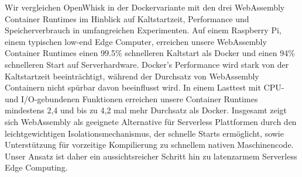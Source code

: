 \documentclass[draft, final, x11names, svgnames]{template/vutinfth} %
\begin{document}
\begin{kurzfassung}
Wir vergleichen OpenWhisk in der Dockervariante mit den drei WebAssembly Container Runtimes im Hinblick auf Kaltstartzeit, Performance und Speicherverbrauch in umfangreichen Experimenten. Auf einem Raspberry Pi, einem typischen low-end Edge Computer, erreichen unsere WebAssembly Container Runtimes einen 99.5\% schnelleren Kaltstart als Docker und einen 94\% schnelleren Start auf Serverhardware. Docker's Performance wird stark von der Kaltstartzeit beeinträchtigt, während der Durchsatz von WebAssembly Containern nicht spürbar davon beeinflusst wird. In einem Lasttest mit CPU- und I/O-gebundenen Funktionen erreichen unsere Container Runtimes mindestens 2,4 und bis zu 4,2 mal mehr Durchsatz als Docker. Insgesamt zeigt sich WebAssembly als geeignete Alternative für Serverless Plattformen durch den leichtgewichtigen Isolationsmechanismus, der schnelle Starts ermöglicht, sowie Unterstützung für vorzeitige Kompilierung zu schnellem nativen Maschinencode. Unser Ansatz ist daher ein aussichtsreicher Schritt hin zu latenzarmem Serverless Edge Computing.

\end{kurzfassung}
\end{document}
